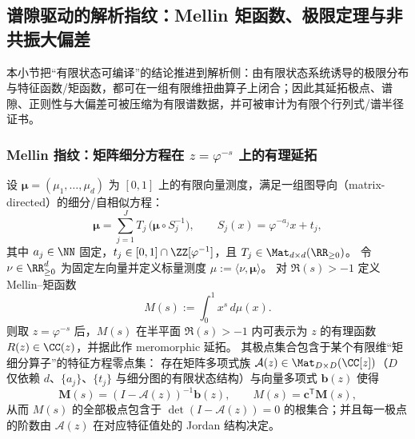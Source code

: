 \subsection{谱隙驱动的解析指纹：Mellin 矩函数、极限定理与非共振大偏差}\label{subsec:operator-mellin-spectral-fingerprint}

本小节把“有限状态可编译”的结论推进到解析侧：由有限状态系统诱导的极限分布与特征函数/矩函数，都可在一组有限维扭曲算子上闭合；因此其延拓极点、谱隙、正则性与大偏差可被压缩为有限谱数据，并可被审计为有限个行列式/谱半径证书。

\subsubsection{Mellin 指纹：矩阵细分方程在 \texorpdfstring{$z=\varphi^{-s}$}{z=phi(-s)} 上的有理延拓}

\begin{theorem}\label{thm:conclusion62-mellin-rational}
设 \(\boldsymbol{\mu}=(\mu_1,\dots,\mu_d)\) 为 \([0,1]\) 上的有限向量测度，满足一组图导向（matrix-directed）的细分/自相似方程：
\begin{equation}\label{eq:operator-mellin-matrix-refinement}
\boldsymbol{\mu}
=\sum_{j=1}^{J}T_j\,\bigl(\boldsymbol{\mu}\circ S_j^{-1}\bigr),
\qquad
S_j(x)=\varphi^{-a_j}x+t_j,
\end{equation}
其中 \(a_j\in\NN\) 固定，\(t_j\in[0,1]\cap\ZZ[\varphi^{-1}]\)，且 \(T_j\in\Mat_{d\times d}(\RR_{\ge 0})\)。
令 \(\nu\in\RR_{\ge 0}^d\) 为固定左向量并定义标量测度 \(\mu:=\langle \nu,\boldsymbol{\mu}\rangle\)。
对 \(\Re(s)>-1\) 定义 Mellin--矩函数
\[
M(s):=\int_{0}^{1}x^{s}\,d\mu(x).
\]
则取 \(z=\varphi^{-s}\) 后，\(M(s)\) 在半平面 \(\Re(s)>-1\) 内可表示为 \(z\) 的有理函数 \(R(z)\in\CC(z)\)，并据此作 meromorphic 延拓。
其极点集合包含于某个有限维“矩细分算子”的特征方程零点集：
存在矩阵多项式族 \(\mathcal{A}(z)\in\Mat_{D\times D}(\CC[z])\)（\(D\) 仅依赖 \(d\)、\(\{a_j\}\)、\(\{t_j\}\) 与细分图的有限状态结构）与向量多项式 \(\mathbf{b}(z)\) 使得
\begin{equation}\label{eq:operator-mellin-linear-system}
\mathbf{M}(s)=(I-\mathcal{A}(z))^{-1}\mathbf{b}(z),
\qquad
M(s)=\mathbf{c}^{\mathsf T}\mathbf{M}(s),
\end{equation}
从而 \(M(s)\) 的全部极点包含于 \(\det(I-\mathcal{A}(z))=0\) 的根集合；并且每一极点的阶数由 \(\mathcal{A}(z)\) 在对应特征值处的 Jordan 结构决定。
\end{theorem}

